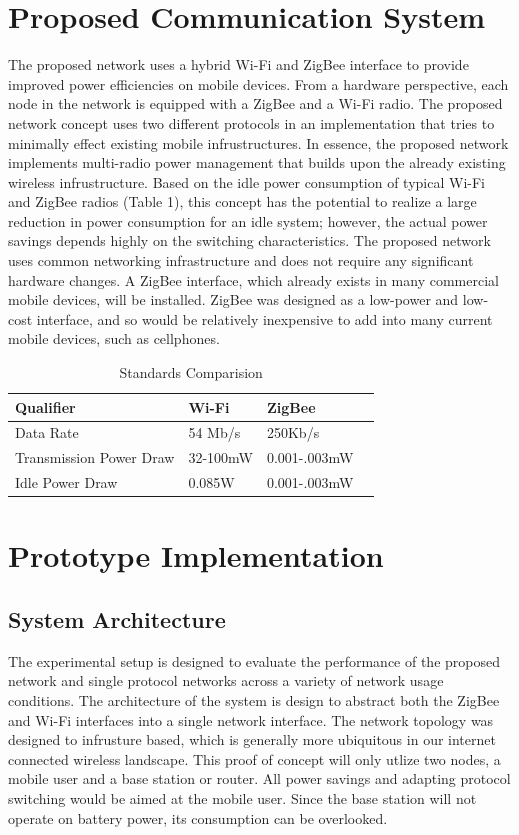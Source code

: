 \documentclass[conference]{IEEEtran}
\begin{document}
\section{Proposed Communication System}
The proposed network uses a hybrid Wi-Fi and ZigBee interface to provide improved power efficiencies on mobile devices.   From a hardware perspective, each node in the network is equipped with a ZigBee and a Wi-Fi radio. The proposed network concept uses two different protocols in an implementation that tries to minimally effect existing mobile infrustructures. In essence, the proposed network implements multi-radio power management that builds upon the already existing wireless infrustructure. Based on the idle power consumption of typical Wi-Fi and ZigBee radios (Table 1), this concept has the potential to realize a large reduction in power consumption for an idle system; however, the actual power savings depends highly on the switching characteristics. The proposed network uses common networking infrastructure and does not require any significant hardware changes. A ZigBee interface, which already exists in many commercial mobile devices, will be installed. ZigBee was designed as a low-power and low-cost interface, and so would be relatively inexpensive to add into many current mobile devices, such as cellphones. 

\setcounter{table}{0}
\begin{table}[h!b!p!]
\caption{Standards Comparision\cite{eight,six,nine,ten,eleven,fourteen}}
\begin{center}
\begin{tabular}{llll}
\hline
Qualifier & Wi-Fi & ZigBee\\
\hline
Data Rate & 54 Mb/s & 250Kb/s\\
Transmission Power Draw & 32-100mW & 0.001-.003mW\\
Idle Power Draw & 0.085W & 0.001-.003mW\\
\hline
\end{tabular}
\end{center}
\label{table1}
\end{table}

\section{Prototype Implementation}
\subsection{System Architecture}
The experimental setup is designed to evaluate the performance of the proposed network and single protocol networks across a variety of network usage conditions.  The architecture of the system is design to abstract both the ZigBee and Wi-Fi interfaces into a single network interface.  The network topology was designed to infrusture based, which is generally more ubiquitous in our internet connected wireless landscape. This proof of concept will only utlize two nodes, a mobile user and a base station or router.  All power savings and adapting protocol switching would be aimed at the mobile user.  Since the base station will not operate on battery power, its consumption can be overlooked.
\end{document}
